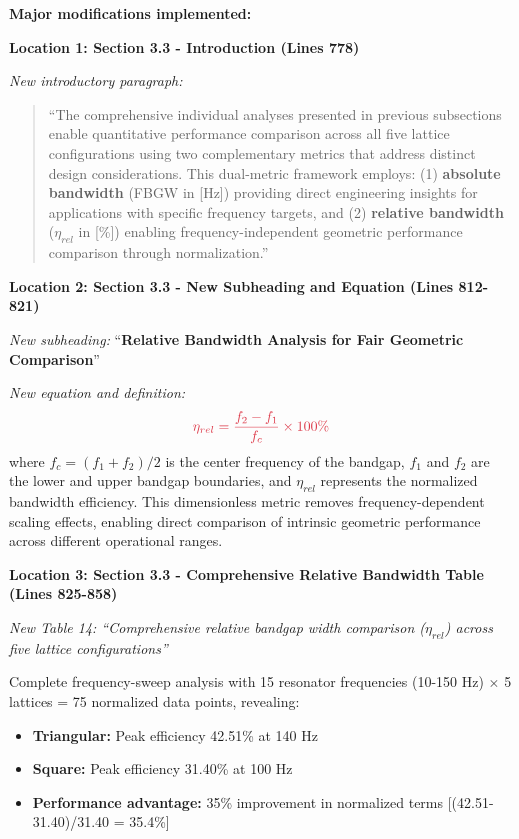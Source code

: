 \documentclass[11pt,a4paper]{article}
\newenvironment{changesbox}{%
    \par\medskip\noindent{\color{changescolor}\rule{\linewidth}{2pt}}\par
    \noindent{\color{changescolor}\bfseries Manuscript Changes}\par\smallskip
}{%
    \par\noindent{\color{changescolor}\rule{\linewidth}{0.5pt}}\medskip
}
\begin{document}
\begin{changesbox}
\textbf{Major modifications implemented:}

\textbf{Location 1: Section 3.3 - Introduction (Lines 778)}

\textit{New introductory paragraph:}
\begin{quote}
\textcolor{redtext}{``The comprehensive individual analyses presented in previous subsections enable quantitative performance comparison across all five lattice configurations using two complementary metrics that address distinct design considerations. This dual-metric framework employs: (1) \textbf{absolute bandwidth} (FBGW in [Hz]) providing direct engineering insights for applications with specific frequency targets, and (2) \textbf{relative bandwidth} ($\eta_{rel}$ in [\%]) enabling frequency-independent geometric performance comparison through normalization.''}
\end{quote}

\textbf{Location 2: Section 3.3 - New Subheading and Equation (Lines 812-821)}

\textit{New subheading:} ``\textbf{Relative Bandwidth Analysis for Fair Geometric Comparison}''

\textit{New equation and definition:}
\begin{equation}
\textcolor{redtext}{\eta_{rel} = \frac{f_2 - f_1}{f_c} \times 100\%}
\end{equation}
\textcolor{redtext}{where $f_c = (f_1 + f_2)/2$ is the center frequency of the bandgap, $f_1$ and $f_2$ are the lower and upper bandgap boundaries, and $\eta_{rel}$ represents the normalized bandwidth efficiency. This dimensionless metric removes frequency-dependent scaling effects, enabling direct comparison of intrinsic geometric performance across different operational ranges.}

\textbf{Location 3: Section 3.3 - Comprehensive Relative Bandwidth Table (Lines 825-858)}

\textit{New Table 14: ``Comprehensive relative bandgap width comparison ($\eta_{rel}$) across five lattice configurations''}

Complete frequency-sweep analysis with 15 resonator frequencies (10-150 Hz) $\times$ 5 lattices = 75 normalized data points, revealing:
\begin{itemize}
    \item \textbf{Triangular:} Peak efficiency 42.51\% at 140 Hz
    \item \textbf{Square:} Peak efficiency 31.40\% at 100 Hz
    \item \textbf{Performance advantage:} 35\% improvement in normalized terms [(42.51-31.40)/31.40 = 35.4\%]
\end{itemize}


\end{changesbox}
\end{document}
